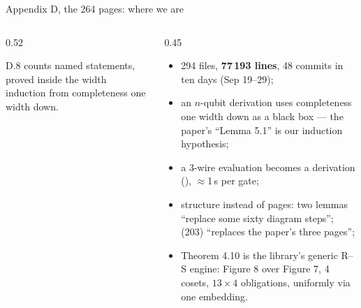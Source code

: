 \begin{frame}{Appendix D, the 264 pages: where we are \New}
\begin{columns}[c]
\begin{column}{0.52\textwidth}
\centering
{}

{\scriptsize D.8 counts named statements, proved inside the width induction from
completeness one width down.}
\end{column}
\begin{column}{0.45\textwidth}
\small
\begin{itemize}
  \setlength{\itemsep}{3pt}
  \item 294 files, \textbf{77\,193 lines}, 48 commits in ten days (Sep 19--29);
  \item an $n$-qubit derivation uses completeness \alert{one width down} as a
        black box --- the paper's ``Lemma 5.1'' is our induction hypothesis;
  \item a 3-wire evaluation  becomes a derivation
        (), $\approx$1\,s per gate;
  \item structure instead of pages: two lemmas ``replace some sixty diagram
        steps''; (203) ``replaces the paper's three pages'';
  \item Theorem 4.10 is the library's \alert{generic} R--S engine: Figure 8 over
        Figure 7, 4 cosets, $13\times4$ obligations, uniformly via one embedding.
\end{itemize}
\end{column}
\end{columns}
\end{frame}

